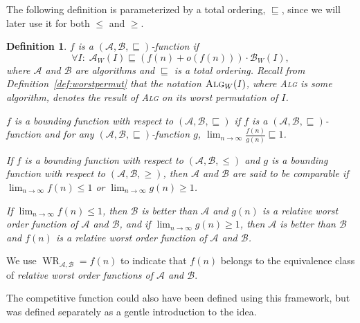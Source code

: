 \documentclass[11pt]{article}
\newtheorem{xdefinition}{Definition}
\newenvironment{definition}{\begin{xdefinition}\rm}{\hspace*{\fill}\raisebox{-1pt}{\boldmath$\Box$}\end{xdefinition}}
\newcommand{\algA}{{\ensuremath{\mathcal{A}}}\xspace}
\newcommand{\algB}{{\ensuremath{\mathcal{B}}}\xspace}
\DeclareMathOperator{\WR}{\textrm{WR}}
\newcommand{\WEHAVE}{\!:\;}
\newcommand{\TO}{\sqsubseteq}
\newcommand{\TRIP}[3]{\ensuremath{(#1,#2,#3)}\xspace}
\begin{document}
The following definition is parameterized by a total ordering,
$\TO$, since we will later use it for both $\leq$ and $\geq$.
\begin{definition}\label{def:wor}
$f$ is a \emph{$\TRIP{\algA}{\algB}{\TO}$-function} if
\[\forall I\WEHAVE \algA_W(I) \TO (f(n)+o(f(n)))\cdot\algB_W(I),\]
where \algA and \algB are algorithms
and $\TO$ is a total ordering.
Recall from Definition~\ref{def:worstpermut} that the notation 
$\textsc{Alg}_W(I)$, where \textsc{Alg} is some algorithm,
denotes the result of \textsc{Alg} on its worst permutation of $I$.


$f$ is a \emph{bounding function with respect to} $\TRIP{\algA}{\algB}{\TO}$ if
$f$ is a $\TRIP{\algA}{\algB}{\TO}$-function and for any
$\TRIP{\algA}{\algB}{\TO}$-function $g$,
$\lim_{n\rightarrow\infty}\frac{f(n)}{g(n)}\TO 1$.


If $f$ is a bounding function with respect to $\TRIP{\algA}{\algB}{\leq}$
and $g$ is a bounding function with respect to $\TRIP{\algA}{\algB}{\geq}$, then
\algA and \algB are said to be \emph{comparable} if
$\lim_{n\rightarrow\infty}f(n)\leq 1$ or $\lim_{n\rightarrow\infty}g(n)\geq 1$.

If $\lim_{n\rightarrow\infty}f(n)\leq 1$, then $\algB$ is better than
$\algA$ and $g(n)$ is a
\emph{relative worst order function of $\algA$ and $\algB$}, and
if $\lim_{n\rightarrow\infty}g(n)\geq 1$, then $\algA$ is better than
$\algB$ and $f(n)$ is a
\emph{relative worst order function of $\algA$ and $\algB$}.
\end{definition}
We use $\WR_{\algA,\algB} = f(n)$ to indicate that $f(n)$ belongs to the
equivalence class of \emph{relative worst order functions of $\algA$ and 
$\algB$}.

The competitive function could also have been defined using this framework,
but was defined separately as a gentle introduction to
the idea.
\end{document}
